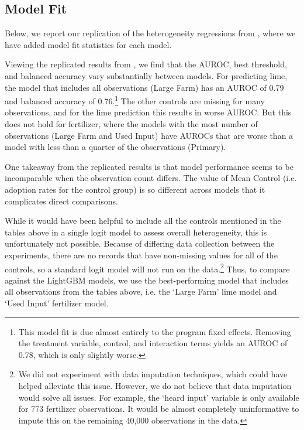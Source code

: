 \documentclass[12pt]{article}
\begin{document}


\subsection{Model Fit}
Below, we report our replication of the heterogeneity regressions from \textcite{fabregas_digital_2025}, where we have added model fit statistics for each model.




Viewing the replicated results from \textcite{fabregas_digital_2025}, we find that the AUROC, best threshold, and balanced accuracy vary substantially between models. For predicting lime, the model that includes all observations (Large Farm) has an AUROC of 0.79 and balanced accuracy of 0.76.\footnote{This model fit is due almost entirely to the program fixed effects. Removing the treatment variable, control, and interaction terms yields an AUROC of 0.78, which is only slightly worse.} The other controls are missing for many observations, and for the lime prediction this results in worse AUROC. But this does not hold for fertilizer, where the models with the most number of observations (Large Farm and Used Input) have AUROCs that are worse than a model with less than a quarter of the observations (Primary).

One takeaway from the replicated results is that model performance seems to be incomparable when the observation count differs. The value of Mean Control (i.e. adoption rates for the control group) is so different across models that it complicates direct comparisons.

While it would have been helpful to include all the controls mentioned in the tables above in a single logit model to assess overall heterogeneity, this is unfortunately not possible. Because of differing data collection between the experiments, there are no records that have non-missing values for all of the controls, so a standard logit model will not run on the data.\footnote{We did not experiment with data imputation techniques, which could have helped alleviate this issue. However, we do not believe that data imputation would solve all issues. For example, the `heard input' variable is only available for 773 fertilizer observations. It would be almost completely uninformative to impute this on the remaining 40,000 observations in the data.} Thus, to compare against the LightGBM models, we use the best-performing model that includes all observations from the tables above, i.e. the `Large Farm' lime model and `Used Input' fertilizer model.
\end{document}
